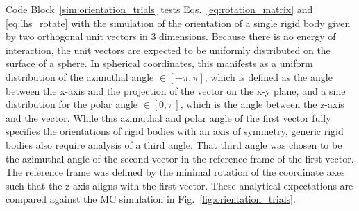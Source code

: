 \documentclass[
  9pt,
  bestpractices,
  pubversion,
]{livecoms}
\begin{document}
Code Block~\ref{sim:orientation_trials} tests Eqs.~\ref{eq:rotation_matrix} and \ref{eq:lhs_rotate} with the simulation of the orientation of a single rigid body given by two orthogonal unit vectors in $3$ dimensions.
Because there is no energy of interaction, the unit vectors are expected to be uniformly distributed on the surface of a sphere.
In spherical coordinates, this manifests as a uniform distribution of the azimuthal angle $\in [-\pi,\pi]$, which is defined as the angle between the x-axis and the projection of the vector on the x-y plane, and a sine distribution for the polar angle $\in [0,\pi]$, which is the angle between the z-axis and the vector.
While this azimuthal and polar angle of the first vector fully specifies the orientations of rigid bodies with an axis of symmetry, generic rigid bodies also require analysis of a third angle.
That third angle was chosen to be the azimuthal angle of the second vector in the reference frame of the first vector.
The reference frame was defined by the minimal rotation of the coordinate axes such that the z-axis aligns with the first vector.
These analytical expectations are compared against the MC simulation in Fig.~\ref{fig:orientation_trials}.

\begin{figure}

\end{figure}
\end{document}
